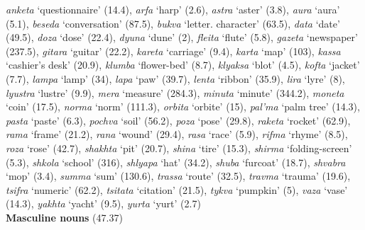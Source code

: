 \documentclass[output=paper, modfonts,newtxmath,hidelinks]{langscibook}
\begin{document}
\noindent \textit{anketa} `questionnaire' (14.4),
\textit{arfa} `harp' (2.6),
\textit{astra} `aster' (3.8),
\textit{aura} `aura' (5.1),
\textit{beseda} `conversation' (87.5),
\textit{bukva} `letter. character' (63.5),
\textit{data} `date' (49.5),
\textit{doza} `dose' (22.4),
\textit{dyuna} `dune' (2),
\textit{fleita} `flute' (5.8),
\textit{gazeta} `newspaper' (237.5),
\textit{gitara} `guitar' (22.2),
\textit{kareta} `carriage' (9.4),
\textit{karta} `map' (103),
\textit{kassa} `cashier's desk' (20.9),
\textit{klumba} `flower-bed' (8.7),
\textit{klyaksa} `blot' (4.5),
\textit{kofta} `jacket' (7.7),
\textit{lampa} `lamp' (34),
\textit{lapa} `paw' (39.7),
\textit{lenta} `ribbon' (35.9),
\textit{lira} `lyre' (8),
\textit{lyustra} `lustre' (9.9),
\textit{mera} `measure' (284.3),
\textit{minuta} `minute' (344.2),
\textit{moneta} `coin' (17.5),
\textit{norma} `norm' (111.3),
\textit{orbita} `orbite' (15),
\textit{pal'ma} `palm tree' (14.3),
\textit{pasta} `paste' (6.3),
\textit{pochva} `soil' (56.2),
\textit{poza} `pose' (29.8),
\textit{raketa} `rocket' (62.9),
\textit{rama} `frame' (21.2),
\textit{rana} `wound' (29.4),
\textit{rasa} `race' (5.9),
\textit{rifma} `rhyme' (8.5),
\textit{roza} `rose' (42.7),
\textit{shakhta} `pit' (20.7),
\textit{shina} `tire' (15.3),
\textit{shirma} `folding-screen' (5.3),
\textit{shkola} `school' (316),
\textit{shlyapa} `hat' (34.2),
\textit{shuba} `furcoat' (18.7),
\textit{shvabra} `mop' (3.4),
\textit{summa} `sum' (130.6),
\textit{trassa} `route' (32.5),
\textit{travma} `trauma' (19.6),
\textit{tsifra} `numeric' (62.2),
\textit{tsitata} `citation' (21.5),
\textit{tykva} `pumpkin' (5),
\textit{vaza} `vase' (14.3),
\textit{yakhta} `yacht' (9.5),
\textit{yurta} `yurt' (2.7)\\

\noindent\textbf{Masculine nouns} (47.37)\\
\end{document}
